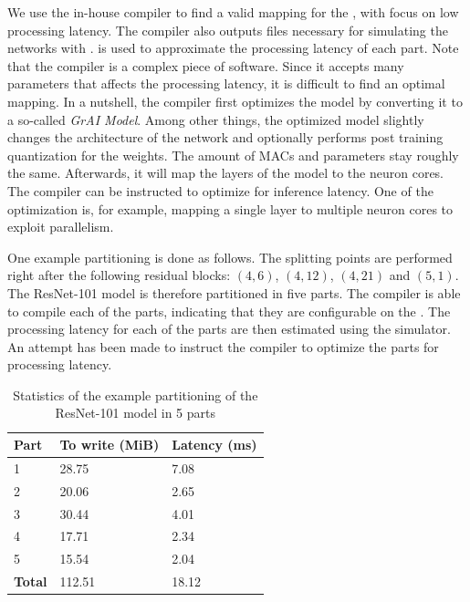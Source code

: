 We use the in-house compiler to find a valid mapping for the \graicore{}, with focus on low processing latency.
The compiler also outputs files necessary for simulating the networks with \graipefruit{}. \graipefruit{} is used to approximate the processing latency of each part.
Note that the compiler is a complex piece of software.
Since it accepts many parameters that affects the processing latency, it is difficult to find an optimal mapping. 
In a nutshell, the compiler first optimizes the model by converting it to a so-called \textit{GrAI Model}.
Among other things, the optimized model slightly changes the architecture of the network and optionally performs post training quantization \autocite{krishnamoorthiQuantizingDeepConvolutional2018} for the weights.
The amount of MACs and parameters stay roughly the same.
Afterwards, it will map the layers of the model to the neuron cores.
The compiler can be instructed to optimize for inference latency.
One of the optimization is, for example, mapping a single layer to multiple neuron cores to exploit parallelism.

One example partitioning is done as follows.
The splitting points are performed right after the following residual blocks: $(4, 6)$, $(4, 12)$, $(4,21)$ and $(5,1)$.
The ResNet-101 model is therefore partitioned in five parts.
The compiler is able to compile each of the parts, indicating that they are configurable on the \graicore{}.
The processing latency for each of the parts are then estimated using the \graipefruit{} simulator.
An attempt has been made to instruct the compiler to optimize the parts for processing latency.

\begin{table}[hbtp]
\centering
\begin{tabular}{@{}lll@{}}
\toprule
\textbf{Part}  & \textbf{To write (MiB)} & \textbf{Latency (ms)} \\ \midrule
1              & 28.75                   & 7.08                  \\
2              & 20.06                   & 2.65                  \\
3              & 30.44                   & 4.01                  \\
4              & 17.71                   & 2.34                  \\
5              & 15.54                   & 2.04                  \\ \midrule
\textbf{Total} & 112.51                  & 18.12                 \\ \bottomrule
\end{tabular}
\caption{Statistics of the example partitioning of the ResNet-101 model in 5 parts}
\label{tab:resnet101_5parts}
\end{table}

